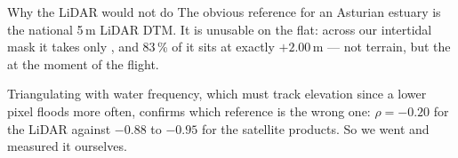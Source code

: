 \begin{pblock}{Why the LiDAR would not do}
The obvious reference for an Asturian estuary is the national 5\,m LiDAR DTM.
It is unusable on the flat: across our intertidal mask it takes only
, and 83\,\% of it sits at exactly $+2.00$\,m
— not terrain, but the  at the moment of the flight.

\vspace{2mm}
Triangulating with water frequency, which must track elevation since a lower
pixel floods more often, confirms which reference is the wrong one:
$\rho=-0.20$ for the LiDAR against $-0.88$ to $-0.95$ for the satellite
products. So we went and measured it ourselves.
\end{pblock}
